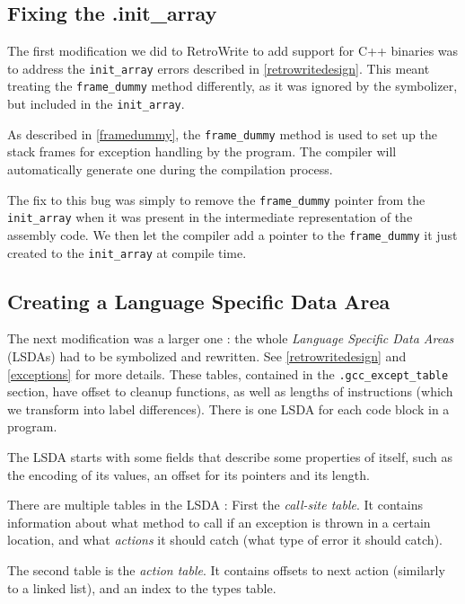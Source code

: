 \documentclass[a4paper,11pt,oneside]{report}
\begin{document}
\subsection{Fixing the .init\_array}
\label{fixinginitarray}

The first modification we did to RetroWrite to add support for C++ binaries
was to address the \texttt{init\_array} errors described in
\autoref{retrowritedesign}.
This meant treating the \texttt{frame\_dummy} method differently, as it was
ignored by the symbolizer, but included in the \texttt{init\_array}.

As described in \autoref{framedummy}, the \texttt{frame\_dummy} method is used
to set up the stack frames for exception handling by the program.
The compiler will automatically generate one during the compilation process.

The fix to this bug was simply to remove the \texttt{frame\_dummy} pointer
from the \texttt{init\_array} when it was present in the intermediate
representation of the assembly code.
We then let the compiler add a pointer to the \texttt{frame\_dummy} it just
created to the \texttt{init\_array} at compile time.

\subsection{Creating a Language Specific Data Area}
\label{creatinglsda}

The next modification was a larger one : the whole \emph{Language Specific
Data Areas} (LSDAs) had to be symbolized and rewritten.
See \autoref{retrowritedesign} and \autoref{exceptions} for more details.
These tables, contained in the \texttt{.gcc\_except\_table} section, have
offset to cleanup functions, as well as lengths of instructions (which we
transform into label differences).
There is one LSDA for each code block in a program.

The LSDA starts with some fields that describe some properties of itself, such
as the encoding of its values, an offset for its pointers and its length.

There are multiple tables in the LSDA : First the \emph{call-site table}.
It contains information about what method to call if an exception is thrown in
a certain location, and what \emph{actions} it should catch (what type of
error it should catch).

The second table is the \emph{action table}. It contains offsets to next
action (similarly to a linked list), and an index to the types table.
\end{document}
